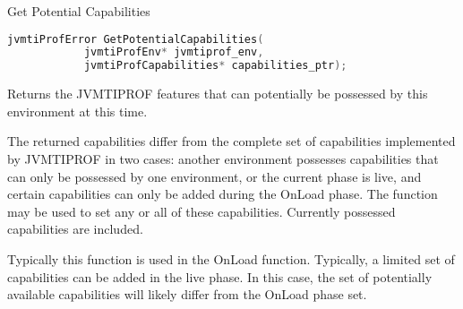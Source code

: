 \begin{apidef}{Get Potential Capabilities}
\begin{lstlisting}[language=C]
jvmtiProfError GetPotentialCapabilities(
            jvmtiProfEnv* jvmtiprof_env,
            jvmtiProfCapabilities* capabilities_ptr);
\end{lstlisting}

\begin{apidesc}
Returns the JVMTIPROF features that can potentially be possessed by this environment at this time. 

\medskip
The returned capabilities differ from the complete set of capabilities implemented by JVMTIPROF in two cases: another environment possesses capabilities that can only be possessed by one environment, or the current phase is live, and certain capabilities can only be added during the OnLoad phase. The  function may be used to set any or all of these capabilities. Currently possessed capabilities are included.

\medskip
Typically this function is used in the OnLoad function. Typically, a limited set of capabilities can be added in the live phase. In this case, the set of potentially available capabilities will likely differ from the OnLoad phase set. 

\end{apidesc}

\begin{apiphase}
\apiphaseonloadlive
\end{apiphase}

\begin{apicap}
\apicaprequired
\end{apicap}

\begin{apiparam}
\end{apiparam}

\begin{apierror}
\end{apierror}
\end{apidef}


